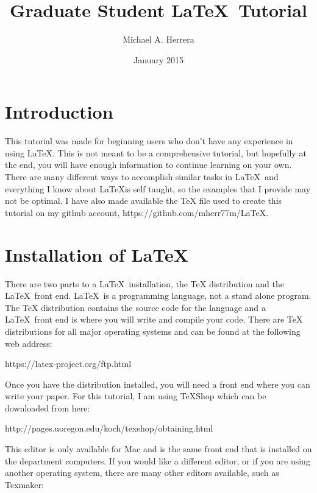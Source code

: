 \documentclass[12pt]{article}
\title{Graduate Student \LaTeX \ Tutorial}
\date{January 2015}
\author{Michael A. Herrera}
\begin{document}
\maketitle

\section{Introduction}

This tutorial was made for beginning users who don't have any experience in using \LaTeX.  This is not meant to be a comprehensive tutorial, but hopefully at the end, you will have enough information to continue learning on your own.  There are many different ways to accomplish similar tasks in \LaTeX \ and everything I know about \LaTeX is self taught, so the examples that I provide may not be optimal.  I have also made available the TeX file used to create this tutorial on my github account, https://github.com/mherr77m/LaTeX.

\section{Installation of \LaTeX}

There are two parts to a \LaTeX \ installation, the TeX distribution and the \LaTeX \ front end.  \LaTeX \ is a programming language, not a stand alone program.  The TeX distribution contains the source code for the language and a \LaTeX \ front end is where you will write and compile your code.  There are TeX distributions for all major operating systems and can be found at the following web address:

\begin{center}
https://latex-project.org/ftp.html
\end{center}

\noindent Once you have the distribution installed, you will need a front end where you can write your paper.  For this tutorial, I am using TeXShop which can be downloaded from here:

\begin{center}
http://pages.uoregon.edu/koch/texshop/obtaining.html
\end{center}

\noindent This editor is only available for Mac and is the same front end that is installed on the department computers.  If you would like a different editor, or if you are using another operating system, there are many other editors available, such as Texmaker:
\end{document}
